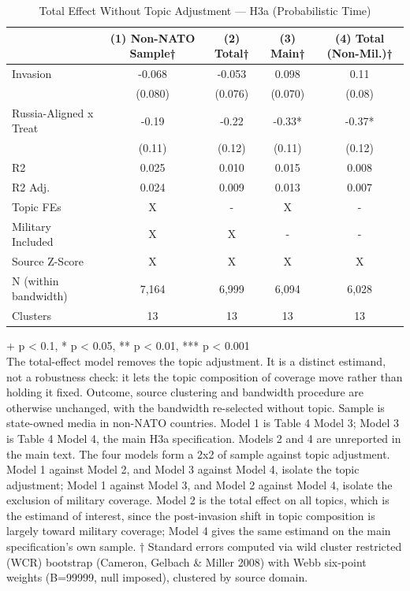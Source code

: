 \begin{table}[t]
\caption{\label{tab:s14c}Total Effect Without Topic Adjustment — H3a (Probabilistic Time)}
\fontsize{12.0pt}{14.0pt}\selectfont
\begin{tabular*}{\linewidth}{@{\extracolsep{\fill}}lcccc}
\toprule
  & (1) Non-NATO Sample† & (2) Total† & (3) Main† & (4) Total (Non-Mil.)† \\ 
\midrule\addlinespace[2.5pt]
Invasion & -0.068 & -0.053 & 0.098 & 0.11 \\ 
 & (0.080) & (0.076) & (0.070) & (0.08) \\ 
Russia-Aligned x Treat & -0.19 & -0.22 & -0.33* & -0.37* \\ 
{} & {(0.11)} & {(0.12)} & {(0.11)} & {(0.12)} \\ 
R2 & 0.025 & 0.010 & 0.015 & 0.008 \\ 
R2 Adj. & 0.024 & 0.009 & 0.013 & 0.007 \\ 
Topic FEs & X & - & X & - \\ 
Military Included & X & X & - & - \\ 
Source Z-Score & X & X & X & X \\ 
N (within bandwidth) & 7,164 & 6,999 & 6,094 & 6,028 \\ 
Clusters & 13 & 13 & 13 & 13 \\ 
\bottomrule
\end{tabular*}
\begin{minipage}{\linewidth}
\vspace{.05em}
+ p < 0.1, * p < 0.05, ** p < 0.01, *** p < 0.001\\
The total-effect model removes the topic adjustment. It is a distinct estimand,
not a robustness check: it lets the topic composition of coverage move rather
than holding it fixed. Outcome, source clustering and bandwidth procedure are
otherwise unchanged, with the bandwidth re-selected without topic. Sample is
state-owned media in non-NATO countries. Model 1 is Table 4 Model 3; Model 3 is
Table 4 Model 4, the main H3a specification. Models 2 and 4 are unreported in
the main text. The four models form a 2x2 of sample against topic adjustment.
Model 1 against Model 2, and Model 3 against Model 4, isolate the topic
adjustment; Model 1 against Model 3, and Model 2 against Model 4, isolate the
exclusion of military coverage. Model 2 is the total effect on all topics, which
is the estimand of interest, since the post-invasion shift in topic composition
is largely toward military coverage; Model 4 gives the same estimand on the
main specification's own sample. † Standard errors computed via wild cluster
restricted (WCR) bootstrap (Cameron, Gelbach \& Miller 2008) with Webb six-point
weights (B=99999, null imposed), clustered by source domain.\\
\end{minipage}
\end{table}

